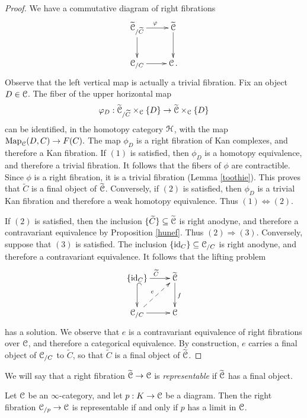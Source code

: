\begin{proof}
We have a commutative diagram of right fibrations
$$ \xymatrix{ \widetilde{\calC}_{/ \widetilde{C}} \ar[r]^{\phi} \ar[d] & \widetilde{\calC} \ar[d] \\
\calC_{/C} \ar[r] & \calC. }$$
Observe that the left vertical map is actually a trivial fibration.
Fix an object $D \in \operatorname{\mathcal{C}}$. The fiber of the upper horizontal map
$$ \varphi_{D}: \widetilde{\operatorname{\mathcal{C}}}_{/ \widetilde{C}} \times_{\operatorname{\mathcal{C}}} \{D\} \rightarrow \widetilde{\operatorname{\mathcal{C}}} \times_{\operatorname{\mathcal{C}}} \{D\}$$ can be identified, in the homotopy category $\operatorname{\mathcal{H}}$, with the map
$\operatorname{{Map}}_{\operatorname{\mathcal{C}}}(D,C) \rightarrow F(C).$ The map $\phi_{D}$ is a right fibration of Kan complexes, and therefore a Kan fibration. If $(1)$ is satisfied, then $\phi_{D}$ is a homotopy equivalence, and therefore a trivial fibration. It follows that the fibers of $\phi$ are contractible. Since $\phi$ is a right fibration, it is a trivial fibration (Lemma \ref{toothie}). This proves that $\widetilde{C}$ is a final object of $\widetilde{\operatorname{\mathcal{C}}}$. Conversely, if $(2)$ is satisfied, then $\phi_{D}$ is a trivial Kan fibration and therefore a weak homotopy equivalence. Thus $(1) \Leftrightarrow (2)$. 

If $(2)$ is satisfied, then the inclusion $\{ \widetilde{C} \} \subseteq \widetilde{\operatorname{\mathcal{C}}}$ is right anodyne, and therefore a contravariant equivalence by Proposition \ref{hunef}. Thus $(2) \Rightarrow (3)$. Conversely, suppose that $(3)$ is satisfied. The inclusion
$\{\operatorname{id}_{C} \} \subseteq \operatorname{\mathcal{C}}_{/C}$ is right anodyne, and therefore a contravariant equivalence. It follows that the lifting problem
$$ \xymatrix{ \{\id_{C} \} \ar[r]^{\widetilde{C}} \ar@{^{(}->}[d] & \widetilde{\calC} \ar[d]^{f} \\
\calC_{/C} \ar[r] \ar@{-->}[ur]^{e} & \calC }$$
has a solution. We observe that $e$ is a contravariant equivalence of right fibrations over $\operatorname{\mathcal{C}}$, and therefore a categorical equivalence. By construction, $e$ carries a final object
of $\operatorname{\mathcal{C}}_{/C}$ to $\widetilde{C}$, so that $\widetilde{C}$ is a final object of $\widetilde{\operatorname{\mathcal{C}}}$. 
\end{proof}

We will say that a right fibration $\widetilde{\operatorname{\mathcal{C}}} \rightarrow \operatorname{\mathcal{C}}$ is {\it representable} if
$\widetilde{\operatorname{\mathcal{C}}}$ has a final object.

\begin{remark}
Let $\operatorname{\mathcal{C}}$ be an $\infty$-category, and let $p: K \rightarrow \operatorname{\mathcal{C}}$ be a diagram. Then
the right fibration $\operatorname{\mathcal{C}}_{/p} \rightarrow \operatorname{\mathcal{C}}$ is representable if and only if $p$ has a limit in $\operatorname{\mathcal{C}}$.
\end{remark}

